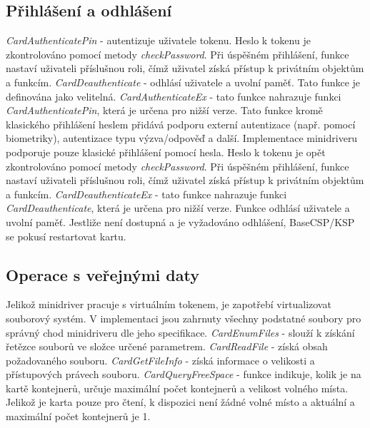 \documentclass[]{fithesis3}
\begin{document}
		\subsection{Přihlášení a odhlášení}
		\textit{CardAuthenticatePin} - autentizuje uživatele tokenu. Heslo k tokenu je 					zkontrolováno pomocí metody \textit{checkPassword}. Při úspěšném přihlášení, funkce 			nastaví uživateli příslušnou roli, čímž uživatel získá přístup k privátním objektům a funkcím.
		\newline
 		\newline
		\textit{CardDeauthenticate} - odhlásí uživatele a uvolní paměť. Tato funkce je definována 			jako velitelná.
		\newline
		\newline
		\textit{CardAuthenticateEx} - tato funkce nahrazuje funkci \textit{CardAuthenticatePin}, 			která je určena pro nižší verze. Tato funkce kromě klasického přihlášení heslem přidává 			podporu externí autentizace (např. pomocí biometriky), autentizace typu výzva/odpověď a 			další. Implementace minidriveru podporuje pouze klasické přihlášení pomocí hesla. Heslo k 			tokenu je opět zkontrolováno pomocí metody \textit{checkPassword}. Při úspěšném 				přihlášení, funkce nastaví uživateli příslušnou roli, čímž uživatel získá přístup k privátním 			objektům a funkcím.
		\newline
 		\newline
		\textit{CardDeauthenticateEx} - tato funkce nahrazuje funkci \textit{CardDeauthenticate}, 		která je určena pro nižší verze. Funkce odhlásí uživatele a uvolní paměť. Jestliže není 				dostupná a je vyžadováno odhlášení, BaseCSP/KSP se pokusí restartovat kartu.
		
		\subsection{Operace s veřejnými daty}
		Jelikož minidriver pracuje s virtuálním tokenem, je zapotřebí virtualizovat souborový 				systém. V implementaci jsou zahrnuty všechny podstatné soubory pro správný chod 				minidriveru dle jeho specifikace.
		\newline
		\newline
		\textit{CardEnumFiles} - slouží k získání řetězce souborů ve složce určené parametrem.
		\newline
 		\newline
		\textit{CardReadFile} - získá obsah požadovaného souboru.
		\newline
		\newline
		\textit{CardGetFileInfo} - získá informace o velikosti a přístupových právech souboru.
		\newline
 		\newline
		\textit{CardQueryFreeSpace} - funkce indikuje, kolik je na kartě kontejnerů, určuje 				maximální počet kontejnerů a velikost volného místa. Jelikož je karta pouze pro čtení, k 			dispozici není žádné volné místo a aktuální a maximální počet kontejnerů je 1.
\end{document}
